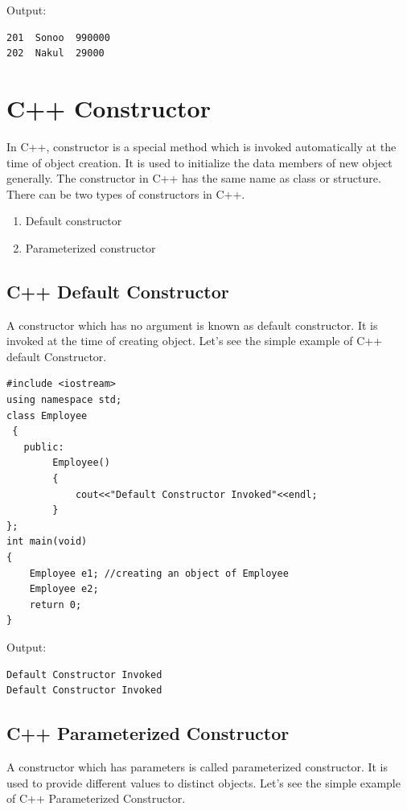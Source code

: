 \documentclass{book}
\begin{document}
Output:

\begin{verbatim}
201  Sonoo  990000
202  Nakul  29000
\end{verbatim}

\section{C++ Constructor}

In C++, constructor is a special method which is invoked automatically at the time of object creation. It is used to initialize the data members of new object generally. The constructor in C++ has the same name as class or structure. There can be two types of constructors in C++.

\begin{enumerate}
	\item Default constructor
\item Parameterized constructor

\end{enumerate}

\subsection{C++ Default Constructor}

A constructor which has no argument is known as default constructor. It is invoked at the time of creating object. Let's see the simple example of C++ default Constructor.

\begin{lstlisting}
#include <iostream>  
using namespace std;  
class Employee  
 {  
   public:  
		Employee()    
		{    
			cout<<"Default Constructor Invoked"<<endl;    
		}    
};  
int main(void)   
{  
	Employee e1; //creating an object of Employee   
	Employee e2;   
	return 0;  
}  
\end{lstlisting}

Output:

\begin{verbatim}
Default Constructor Invoked 
Default Constructor Invoked
\end{verbatim}

\subsection{C++ Parameterized Constructor}

A constructor which has parameters is called parameterized constructor. It is used to provide different values to distinct objects. Let's see the simple example of C++ Parameterized Constructor.
\end{document}
